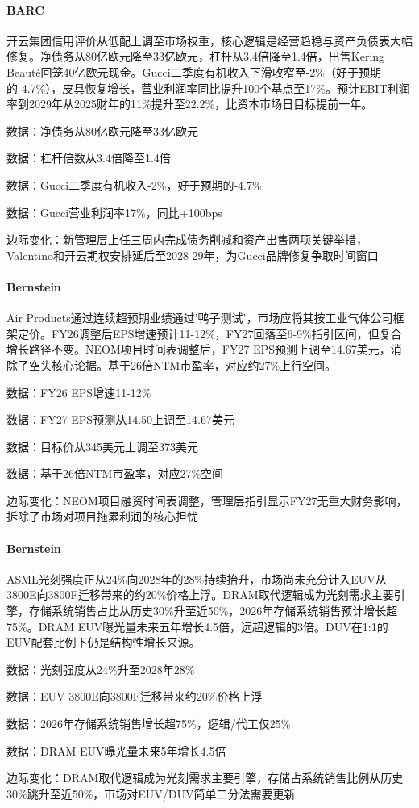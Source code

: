 \documentclass[11pt]{ctexart}
\begin{document}
\paragraph{BARC} 开云集团信用评价从低配上调至市场权重，核心逻辑是经营趋稳与资产负债表大幅修复。净债务从80亿欧元降至33亿欧元，杠杆从3.4倍降至1.4倍，出售Kering Beauté回笼40亿欧元现金。Gucci二季度有机收入下滑收窄至-2\%（好于预期的-4.7\%），皮具恢复增长，营业利润率同比提升100个基点至17\%。预计EBIT利润率到2029年从2025财年的11\%提升至22.2\%，比资本市场日目标提前一年。
{\small\color{refgray}数据：净债务从80亿欧元降至33亿欧元\par}
{\small\color{refgray}数据：杠杆倍数从3.4倍降至1.4倍\par}
{\small\color{refgray}数据：Gucci二季度有机收入-2\%，好于预期的-4.7\%\par}
{\small\color{refgray}数据：Gucci营业利润率17\%，同比+100bps\par}
{\small\color{refgray}边际变化：新管理层上任三周内完成债务削减和资产出售两项关键举措，Valentino和开云期权安排延后至2028-29年，为Gucci品牌修复争取时间窗口\par}
\paragraph{Bernstein} Air Products通过连续超预期业绩通过'鸭子测试'，市场应将其按工业气体公司框架定价。FY26调整后EPS增速预计11-12\%，FY27回落至6-9\%指引区间，但复合增长路径不变。NEOM项目时间表调整后，FY27 EPS预测上调至14.67美元，消除了空头核心论据。基于26倍NTM市盈率，对应约27\%上行空间。
{\small\color{refgray}数据：FY26 EPS增速11-12\%\par}
{\small\color{refgray}数据：FY27 EPS预测从14.50上调至14.67美元\par}
{\small\color{refgray}数据：目标价从345美元上调至373美元\par}
{\small\color{refgray}数据：基于26倍NTM市盈率，对应27\%空间\par}
{\small\color{refgray}边际变化：NEOM项目融资时间表调整，管理层指引显示FY27无重大财务影响，拆除了市场对项目拖累利润的核心担忧\par}
\paragraph{Bernstein} ASML光刻强度正从24\%向2028年的28\%持续抬升，市场尚未充分计入EUV从3800E向3800F迁移带来的约20\%价格上浮。DRAM取代逻辑成为光刻需求主要引擎，存储系统销售占比从历史30\%升至近50\%，2026年存储系统销售预计增长超75\%。DRAM EUV曝光量未来五年增长4.5倍，远超逻辑的3倍。DUV在1:1的EUV配套比例下仍是结构性增长来源。
{\small\color{refgray}数据：光刻强度从24\%升至2028年28\%\par}
{\small\color{refgray}数据：EUV 3800E向3800F迁移带来约20\%价格上浮\par}
{\small\color{refgray}数据：2026年存储系统销售增长超75\%，逻辑/代工仅25\%\par}
{\small\color{refgray}数据：DRAM EUV曝光量未来5年增长4.5倍\par}
{\small\color{refgray}边际变化：DRAM取代逻辑成为光刻需求主要引擎，存储占系统销售比例从历史30\%跳升至近50\%，市场对EUV/DUV简单二分法需要更新\par}
\end{document}
